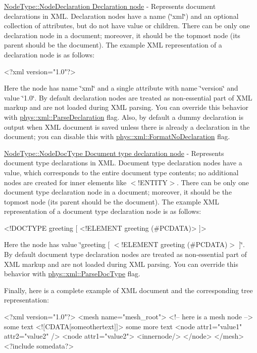 \begin{DoxyItemize}
\item \hyperlink{namespacephys_1_1xml_a668b0cc666a9d49f7c7222a7552115d3}{NodeType::NodeDeclaration Declaration node} -\/ Represents document declarations in XML. Declaration nodes have a name (\char`\"{}xml\char`\"{}) and an optional collection of attributes, but do not have value or children. There can be only one declaration node in a document; moreover, it should be the topmost node (its parent should be the document). The example XML representation of a declaration node is as follows: 
\begin{DoxyCode}
 <?xml version="1.0"?> 
\end{DoxyCode}
 Here the node has name \char`\"{}xml\char`\"{} and a single attribute with name \char`\"{}version\char`\"{} and value \char`\"{}1.0\char`\"{}. By default declaration nodes are treated as non-\/essential part of XML markup and are not loaded during XML parsing. You can override this behavior with \hyperlink{namespacephys_1_1xml_a463f15fc43d69ab835c8598826f65646}{phys::xml::ParseDeclaration} flag. Also, by default a dummy declaration is output when XML document is saved unless there is already a declaration in the document; you can disable this with \hyperlink{namespacephys_1_1xml_aee4ccb3535945d4808a0cf6abe4cb050}{phys::xml::FormatNoDeclaration} flag. \par

\item \hyperlink{namespacephys_1_1xml_a668b0cc666a9d49f7c7222a7552115d3}{NodeType::NodeDocType Document type declaration node} -\/ Represents document type declarations in XML. Document type declaration nodes have a value, which corresponds to the entire document type contents; no additional nodes are created for inner elements like $<$!ENTITY$>$. There can be only one document type declaration node in a document; moreover, it should be the topmost node (its parent should be the document). The example XML representation of a document type declaration node is as follows: 
\begin{DoxyCode}
 <!DOCTYPE greeting [ <!ELEMENT greeting (#PCDATA)> ]> 
\end{DoxyCode}
 Here the node has value \char`\"{}greeting \mbox{[} $<$!ELEMENT greeting (\#PCDATA)$>$ \mbox{]}\char`\"{}. By default document type declaration nodes are treated as non-\/essential part of XML markup and are not loaded during XML parsing. You can override this behavior with \hyperlink{namespacephys_1_1xml_adf5ee79dc4c200ad85b64a8308b0c805}{phys::xml::ParseDocType} flag. \par
 \par
 \par
 Finally, here is a complete example of XML document and the corresponding tree representation: 
\begin{DoxyCode}
 <?xml version="1.0"?>
 <mesh name="mesh_root">
     <!-- here is a mesh node -->
     some text
     <![CDATA[someothertext]]>
     some more text
     <node attr1="value1" attr2="value2" />
     <node attr1="value2">
         <innernode/>
     </node>
 </mesh>
 <?include somedata?>
\end{DoxyCode}
  

\end{DoxyItemize}
